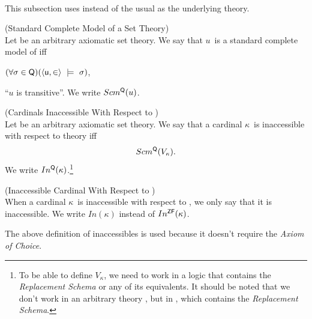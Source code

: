 
\

This subsection uses  instead of the usual  as the underlying theory. %

\begin{definition}{(Standard Complete Model of a Set Theory)}\label{def:scm_q}\\
Let  be an arbitrary axiomatic set theory.
We say that $u$ is a standard complete model of  iff
\bce[(i)]
\item $(\forall \sigma \in \sf{Q})(\langle u, \in \rangle~\models~\sigma)$,
\item ``$u$ is transitive''.
\ece 
We write $Scm^{\sf{Q}}(u)$.
\end{definition}

\begin{definition}{(Cardinals Inaccessible With Respect to )}\label{def:levy_inaccessible_q}\\
Let  be an arbitrary axiomatic set theory. We say that a cardinal $\kappa$ is inaccessible with respect to theory  iff
\begin{equation}
Scm^{\sf{Q}}(V_\kappa)\mbox{.}
\end{equation}
We write $In^{\sf{Q}}(\kappa)$.\footnote{To be able to define $V_\kappa$, we need to work in a logic that contains the \emph{Replacement Schema} or any of its equivalents. It should be noted that we don't work in an arbitrary theory , but in , which contains the \emph{Replacement Schema}. 
}
\end{definition}

\begin{definition}{(Inaccessible Cardinal With Respect to )}\label{def:levy_inaccessible}\\
When a cardinal $\kappa$ is inaccessible with respect to , we only say that it is inaccessible. We write $In(\kappa)$ instead of $In^{\sf{ZF}}(\kappa)$.
\end{definition}
The above definition of inaccessibles is used because it doesn't require the \emph{Axiom of Choice}.

